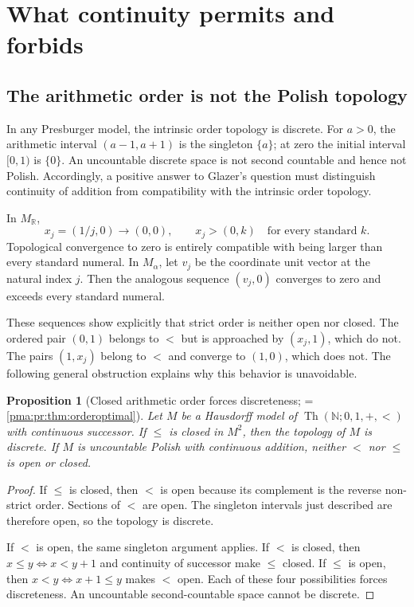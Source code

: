\documentclass[11pt]{article}
\numberwithin{equation}{section}
\newtheorem{proposition}[proposition]{Proposition}
\theoremstyle{definition}
\theoremstyle{remark}
\newcommand{\N}{\mathbb N}
\newcommand{\R}{\mathbb R}
\newcommand{\Th}{\operatorname{Th}}
\begin{document}
\section{What continuity permits and forbids}
\label{pma:cp:sec:obstructions}

\subsection{The arithmetic order is not the Polish topology}

In any Presburger model, the intrinsic order topology is discrete.
For $a>0$, the arithmetic interval $(a-1,a+1)$ is the singleton $\{a\}$;
at zero the initial interval $[0,1)$ is $\{0\}$.
An uncountable discrete space is not second countable and hence not Polish.
Accordingly, a positive answer to Glazer's question must distinguish
continuity of addition from compatibility with the intrinsic order topology.

In $M_{\R}$,
\[
x_j=(1/j,0)\longrightarrow(0,0),
\qquad x_j>(0,k)\quad\text{for every standard }k.
\]
Topological convergence to zero is entirely compatible with being larger
than every standard numeral. In $M_\alpha$, let $v_j$ be the coordinate
unit vector at the natural index $j$. Then the analogous sequence
$(v_j,0)$ converges to zero and exceeds every standard numeral.

These sequences show explicitly that strict order is neither open nor
closed. The ordered pair $(0,1)$ belongs to $<$ but is approached by
$(x_j,1)$, which do not. The pairs $(1,x_j)$ belong to $<$ and converge
to $(1,0)$, which does not. The following general obstruction explains why
this behavior is unavoidable.

\begin{proposition}[Closed arithmetic order forces discreteness; = \cref{pma:pr:thm:orderoptimal}]
\label{pma:cp:prop:closedorder}
Let $M$ be a Hausdorff model of $\Th(\N;0,1,+,<)$ with continuous successor.
If $\leq$ is closed in $M^2$, then the topology of $M$ is discrete.
If $M$ is uncountable Polish with continuous addition, neither $<$ nor
$\leq$ is open or closed.
\end{proposition}

\begin{proof}
If $\leq$ is closed, then $<$ is open because its complement is the
reverse non-strict order. Sections of $<$ are open. The singleton
intervals just described are therefore open, so the topology is discrete.

If $<$ is open, the same singleton argument applies. If $<$ is closed,
then $x\leq y\Longleftrightarrow x<y+1$ and continuity of successor
make $\leq$ closed. If $\leq$ is open, then
$x<y\Longleftrightarrow x+1\leq y$ makes $<$ open. Each of these four
possibilities forces discreteness. An uncountable second-countable space
cannot be discrete.
\end{proof}
\end{document}
